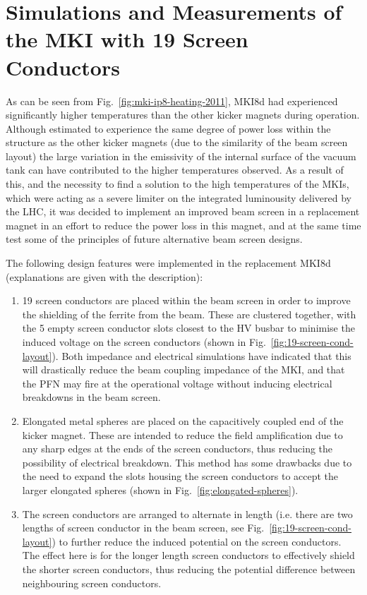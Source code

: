 \section{Simulations and Measurements of the MKI with 19 Screen Conductors}

As can be seen from Fig.~\ref{fig:mki-ip8-heating-2011}, MKI8d had experienced significantly higher temperatures than the other kicker magnets during operation. Although estimated to experience the same degree of power loss within the structure as the other kicker magnets (due to the similarity of the beam screen layout) the large variation in the emissivity of the internal surface of the vacuum tank can have contributed to the higher temperatures observed. As a result of this, and the necessity to find a solution to the high temperatures of the MKIs, which were acting as a severe limiter on the integrated luminousity delivered by the LHC, it was decided to implement an improved beam screen in a replacement magnet in an effort to reduce the power loss in this magnet, and at the same time test some of the principles of future alternative beam screen designs.

The following design features were implemented in the replacement MKI8d (explanations are given with the description):

\begin{enumerate}
\item{19 screen conductors are placed within the beam screen in order to improve the shielding of the ferrite from the beam. These are clustered together, with the 5 empty screen conductor slots closest to the HV busbar to minimise the induced voltage on the screen conductors (shown in Fig.~\ref{fig:19-screen-cond-layout}). Both impedance and electrical simulations have indicated that this will drastically reduce the beam coupling impedance of the MKI, and that the PFN may fire at the operational voltage without inducing electrical breakdowns in the beam screen.}
\item{Elongated metal spheres are placed on the capacitively coupled end of the kicker magnet. These are intended to reduce the field amplification due to any sharp edges at the ends of the screen conductors, thus reducing the possibility of electrical breakdown. This method has some drawbacks due to the need to expand the slots housing the screen conductors to accept the larger elongated spheres (shown in Fig.~\ref{fig:elongated-spheres}).}
\item{The screen conductors are arranged to alternate in length (i.e. there are two lengths of screen conductor in the beam screen, see Fig.~\ref{fig:19-screen-cond-layout}) to further reduce the induced potential on the screen conductors. The effect here is for the longer length screen conductors to effectively shield the shorter screen conductors, thus reducing the potential difference between neighbouring screen conductors.}
\end{enumerate}

